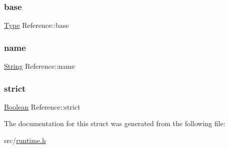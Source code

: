 \subsubsection{\texorpdfstring{base}{base}}
{\footnotesize\ttfamily \hyperlink{class_type}{Type} Reference\+::base}

\mbox{\label{struct_reference_a57fd6856086b16e1740a6f867dedd3f7}} 
\subsubsection{\texorpdfstring{name}{name}}
{\footnotesize\ttfamily \hyperlink{struct_string}{String} Reference\+::name}

\mbox{\label{struct_reference_a50a8f0c6fe1ae030e97ad258e60c6d2b}} 
\subsubsection{\texorpdfstring{strict}{strict}}
{\footnotesize\ttfamily \hyperlink{struct_boolean}{Boolean} Reference\+::strict}



The documentation for this struct was generated from the following file\+:\begin{DoxyCompactItemize}
\item 
src/\hyperlink{runtime_8h}{runtime.\+h}\end{DoxyCompactItemize}
